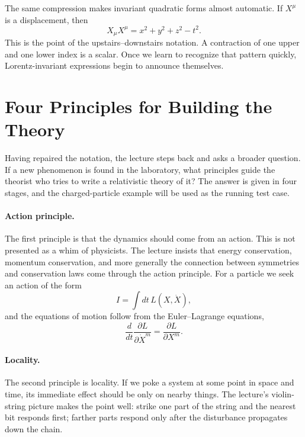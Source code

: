 The same compression makes invariant quadratic forms almost automatic. If \(X^\mu\) is a displacement, then
\begin{equation}
X_\mu X^\mu=x^2+y^2+z^2-t^2.
\end{equation}
This is the point of the upstairs--downstairs notation. A contraction of one upper and one lower index is a scalar. Once we learn to recognize that pattern quickly, Lorentz-invariant expressions begin to announce themselves.

\section{Four Principles for Building the Theory}

Having repaired the notation, the lecture steps back and asks a broader question. If a new phenomenon is found in the laboratory, what principles guide the theorist who tries to write a relativistic theory of it? The answer is given in four stages, and the charged-particle example will be used as the running test case.

\paragraph{Action principle.}
The first principle is that the dynamics should come from an action. This is not presented as a whim of physicists. The lecture insists that energy conservation, momentum conservation, and more generally the connection between symmetries and conservation laws come through the action principle. For a particle we seek an action of the form
\begin{equation}
I=\int dt\,L(X,\dot X),
\end{equation}
and the equations of motion follow from the Euler--Lagrange equations,
\begin{equation}
\frac{d}{dt}\frac{\partial L}{\partial \dot X^m}=\frac{\partial L}{\partial X^m}.
\end{equation}

\paragraph{Locality.}
The second principle is locality. If we poke a system at some point in space and time, its immediate effect should be only on nearby things. The lecture's violin-string picture makes the point well: strike one part of the string and the nearest bit responds first; farther parts respond only after the disturbance propagates down the chain.

